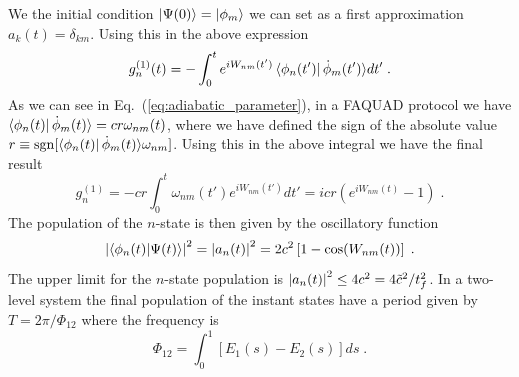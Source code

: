 \documentclass[a4paper,11pt]{article}
\begin{document}
We the initial condition $\ket{\Psi(0)}=\ket{\phi_m}$ we can set as a first approximation $a_k(t)=\delta_{km}$. Using this in the above expression
\begin{equation}
	g_n^{(1)}(t)=-\int_0^te^{iW_{nm}(t')}\bra{\phi_n(t')}\dot{\phi}_m(t')\rangle dt'\; .
\end{equation}
As we can see in Eq.~(\ref{eq:adiabatic_parameter}), in a FAQUAD protocol we have $\bra{\phi_n(t)}\dot{\phi}_m(t)\rangle=cr\omega_{nm}(t)$, where we have defined the sign of the absolute value $r\equiv \operatorname{sgn}[\bra{\phi_n(t)}\dot{\phi}_m(t)\rangle\omega_{nm}]$. Using this in the above integral we have the final result
\begin{equation}
	g_n^{(1)}=-cr\int_0^t\omega_{nm}(t')e^{iW_{nm}(t')}dt'=icr\left(e^{iW_{nm}(t)}-1\right)\; .
\end{equation}
The population of the $n$-state is then given by the oscillatory function
\begin{equation}
	\abs{\braket{\phi_n(t)}{\Psi(t)}}^2=\abs{a_n(t)}^2=2c^2\left[1-\cos(W_{nm}(t))\right]\; .
\end{equation}
The upper limit for the $n$-state population is $\abs{a_n(t)}^2\leq4c^2=4\tilde{c}^2/t_f^2$. In a two-level system the final population of the instant states have a period given by $T=2\pi/\Phi_{12}$ where the frequency is
\begin{equation}
	\Phi_{12}=\int_0 ^1 [E_1(s)-E_2(s)]ds\; .
\end{equation}
\end{document}
